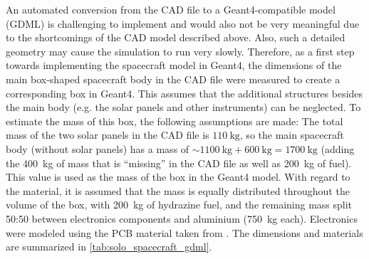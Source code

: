 An automated conversion from the \ac{CAD} file to a \ac{Geant4}-compatible model (GDML) is challenging to implement and would also not be very meaningful due to the shortcomings of the \ac{CAD} model described above. Also, such a detailed geometry may cause the simulation to run very slowly.
Therefore, as a first step towards implementing the spacecraft model in \ac{Geant4}, the dimensions of the main box-shaped spacecraft body in the \ac{CAD} file were measured to create a corresponding box in \ac{Geant4}. This assumes that the additional structures besides the main body (e.g. the solar panels and other instruments) can be neglected. To estimate the mass of this box, the following assumptions are made: 
The total mass of the two solar panels in the \ac{CAD} file is $\SI{110}{\kilo\gram}$, so the main spacecraft body (without solar panels) has a mass of $\sim\SI{1100}{\kilogram} + \SI{600}{\kilogram} = \SI{1700}{\kilogram}$ (adding the \SI{400}{\kilogram} of mass that is ``missing'' in the \ac{CAD} file as well as \SI{200}{\kilogram} of fuel). This value is used as the mass of the box in the \ac{Geant4} model.
With regard to the material, it is assumed that the mass is equally distributed throughout the volume of the box, with \SI{200}{\kilogram} of hydrazine fuel, and the remaining mass split 50:50 between electronics components and aluminium (\SI{750}{\kilogram} each). Electronics were modeled using the \ac{PCB} material taken from \citet{Appel-2018,Appel-2018-PhD}.
The dimensions and materials are summarized in \autoref{tab:solo_spacecraft_gdml}.

